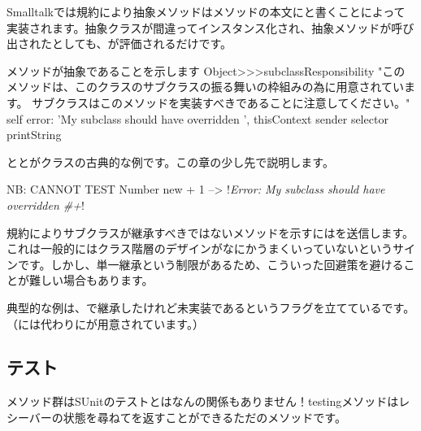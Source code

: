 \documentclass[a4paper,10pt,twoside]{book}
\begin{document}
Smalltalkでは規約により抽象メソッドはメソッドの本文にと書くことによって実装されます。抽象クラスが間違ってインスタンス化され、抽象メソッドが呼び出されたとしても、が評価されるだけです。

\begin{method}{メソッドが抽象であることを示します}
Object>>>subclassResponsibility
    "このメソッドは、このクラスのサブクラスの振る舞いの枠組みの為に用意されています。
    サブクラスはこのメソッドを実装すべきであることに注意してください。"
    self error: 'My subclass should have overridden ', thisContext sender selector printString
\end{method}

ととがクラスの古典的な例です。この章の少し先で説明します。

\begin{code}{NB: CANNOT TEST}
Number new + 1 --> !\emph{Error: My subclass should have overridden \#+}!
\end{code}

規約によりサブクラスが継承すべきではないメソッドを示すにはを送信します。これは一般的にはクラス階層のデザインがなにかうまくいっていないというサインです。しかし、単一継承という制限があるため、こういった回避策を避けることが難しい場合もあります。

典型的な例は、で継承したけれど未実装であるというフラグを立てているです。（には代わりにが用意されています。）



\subsection{テスト}

メソッド群はSUnitのテストとはなんの関係もありません！testingメソッドはレシーバーの状態を尋ねてを返すことができるただのメソッドです。
\end{document}
